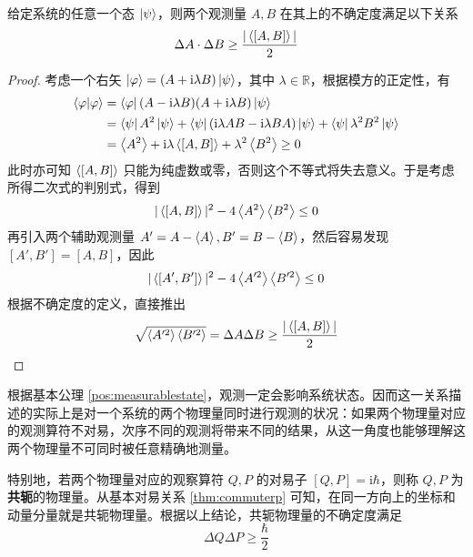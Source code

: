 \documentclass[cn,10pt,math=newtx,citestyle=gb7714-2015,bibstyle=gb7714-2015]{elegantbook}
\def\i{\mathrm i}
\def\R{\mathbb R}
\def\vphi{\varphi}
\begin{document}
\begin{theorem}[不确定度关系式]\label{def:indefinite}
   给定系统的任意一个态 $\ket{\psi}$，则两个观测量 $A,B$ 在其上的不确定度满足以下关系
   \begin{equation}
       \Delta A\cdot\Delta B\ge\frac{|\Braket{[A,B]}|}2
   \end{equation}
\end{theorem}

\begin{proof}
    考虑一个右矢 $\ket{\vphi}=(A+\i\lambda B)\ket{\psi}$，其中 $\lambda\in\R$，根据模方的正定性，有
    \begin{align*}
        \braket{\vphi|\vphi}& =\bra{\vphi}(A-\i\lambda B)(A+\i\lambda B)\ket{\psi}\\
        &=\bra{\psi}A^2\ket{\psi}+\bra{\psi}(\i\lambda AB-\i\lambda BA)\ket{\psi}+\bra{\psi}\lambda^2B^2\ket{\psi}\\
        &=\Braket{A^2}+\i\lambda\Braket{[A,B]}+\lambda^2\Braket{B^2}\ge 0
    \end{align*}
    此时亦可知 $\Braket{[A,B]}$ 只能为纯虚数或零，否则这个不等式将失去意义。于是考虑所得二次式的判别式，得到
    \begin{equation*}
        |\Braket{[A,B]}|^2-4\Braket{A^2}\Braket{B^2}\le 0
    \end{equation*}
    再引入两个辅助观测量 $A'=A-\Braket{A},B'=B-\Braket{B}$，然后容易发现 $[A',B']=[A,B]$，因此
    \begin{equation*}
        |\Braket{[A',B']}|^2-4\Braket{A'^2}\Braket{B'^2}\le 0
    \end{equation*}
    根据不确定度的定义，直接推出
    \begin{equation*}
        \sqrt{\Braket{A'^2}\Braket{B'^2}}=\Delta A\Delta B\ge \frac{|\Braket{[A,B]}|}2
    \end{equation*}
\end{proof}

根据基本公理 \ref{pos:measurablestate}，观测一定会影响系统状态。因而这一关系描述的实际上是对一个系统的两个物理量同时进行观测的状况：如果两个物理量对应的观测算符不对易，次序不同的观测将带来不同的结果，从这一角度也能够理解这两个物理量不可同时被任意精确地测量。

特别地，若两个物理量对应的观察算符 $Q,P$ 的对易子 $[Q,P]=\i\hbar$，则称 $Q,P$ 为\textbf{共轭}的物理量。从基本对易关系 \ref{thm:commuterp} 可知，在同一方向上的坐标和动量分量就是共轭物理量。根据以上结论，共轭物理量的不确定度满足
    \begin{equation}
        \Delta Q\Delta P\ge\frac\hbar 2
    \end{equation}
\end{document}
